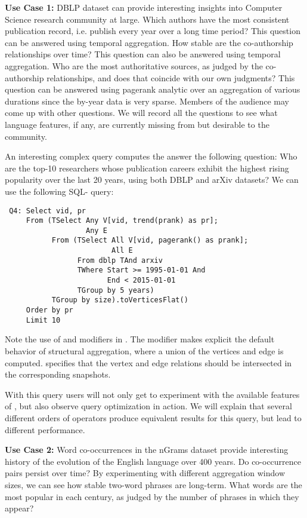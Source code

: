 {\bf Use Case 1:} DBLP dataset can provide interesting insights into
Computer Science research community at large.  Which authors have the
most consistent publication record, i.e. publish every year over a
long time period? This question can be answered using temporal
aggregation.  How stable are the co-authorship relationships over
time? This question can also be answered using temporal aggregation.
Who are the most authoritative sources, as judged by the co-authorship
relationships, and does that coincide with our own judgments?  This
question can be answered using pagerank analytic over an aggregation
of various durations since the by-year data is very sparse.  Members
of the audience may come up with other questions.  We will record all
the questions to see what language features, if any, are currently
missing from \ql but desirable to the community.

An interesting complex query computes the answer the following
question: Who are the top-10 researchers whose publication careers
exhibit the highest rising popularity over the last 20 years, using
both DBLP and arXiv datasets?  We can use the following SQL-\ql
query:

\begin{small}
\begin{verbatim}
 Q4: Select vid, pr
     From (TSelect Any V[vid, trend(prank) as pr];
                   Any E
           From (TSelect All V[vid, pagerank() as prank]; 
                         All E
                 From dblp TAnd arxiv
                 TWhere Start >= 1995-01-01 And
                        End < 2015-01-01
                 TGroup by 5 years)
           TGroup by size).toVerticesFlat()
     Order by pr
     Limit 10
\end{verbatim}
\end{small}

Note the use of  and  modifiers in .
The  modifier makes explicit the default behavior of
structural aggregation, where a union of the vertices and edge is
computed.   specifies that the vertex and edge relations
should be intersected in the corresponding snapshots.

With this query users will not only get to experiment with the
available features of \ql, but also observe query optimization in
action.  We will explain that several different orders of operators
produce equivalent results for this query, but lead to different
performance.

{\bf Use Case 2:} Word co-occurrences in the nGrams dataset provide
interesting history of the evolution of the English language over 400
years.  Do co-occurrence pairs persist over time?  By experimenting
with different aggregation window sizes, we can see how stable
two-word phrases are long-term.  What words are the most popular in
each century, as judged by the number of phrases in which they appear?

